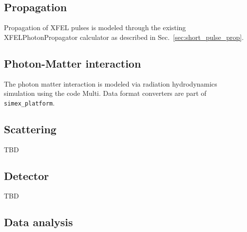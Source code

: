 \documentclass[a4paper]{article}
\begin{document}
\subsection{Propagation}
Propagation of XFEL pulses is modeled through the existing XFELPhotonPropagator calculator as described in Sec.~\ref{sec:short_pulse_prop}.
\subsection{Photon-Matter interaction}
The photon matter interaction is modeled via radiation hydrodynamics simulation using the code Multi. Data format converters are part of
\texttt{simex\_platform}.
\subsection{Scattering}
TBD
\subsection{Detector}
TBD
\subsection{Data analysis}

\printbibliography
\end{document}
